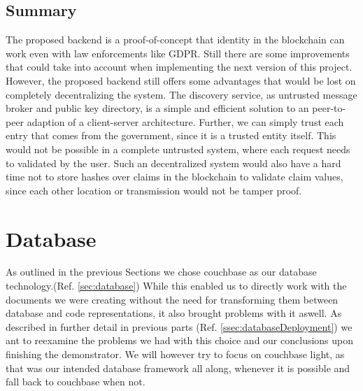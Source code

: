 \subsection{Summary}
The proposed backend is a proof-of-concept that identity in the blockchain can work even with law enforcements like GDPR. Still there are some improvements that could take into account when implementing the next version of this project. However, the proposed backend still offers some advantages that would be lost on completely decentralizing the system. The discovery service, as untrusted message broker and public key directory, is a simple and efficient solution to an peer-to-peer adaption of a client-server architecture. Further, we can simply trust each entry that comes from the government, since it is a trusted entity itself. This would not be possible in a complete untrusted system, where each request needs to validated by the user. Such an decentralized system would also have a hard time not to store hashes over claims in the blockchain to validate claim values, since each other location or transmission would not be tamper proof. 

\section{Database}
\label{sec:databaseEval}
As outlined in the previous Sections we chose couchbase as our database technology.(Ref. \ref{sec:database}) While this enabled us to directly work with the documents we were creating without the need for transforming them between database and code representations, it also brought problems with it aswell.
As described in further detail in previous parts (Ref. \ref{ssec:databaseDeployment}) we ant to reexamine the problems we had with this choice and our conclusions upon finishing the demonstrator. We will however try to focus on couchbase light, as that was our intended database framework all along, whenever it is possible and fall back to couchbase when not.

